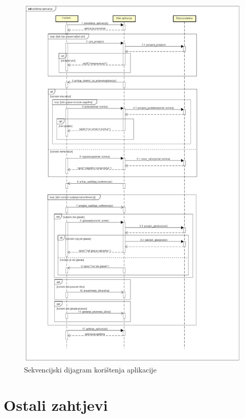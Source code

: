 				\begin{figure}[H]
					\includegraphics[scale=0.3]{slike/koristenje_aplikacije.JPG} %
					\centering
					\caption{Sekvencijski dijagram korištenja aplikacije}
					\label{fig:promjene}
				\end{figure}
	
		\section{Ostali zahtjevi}
		
		 
